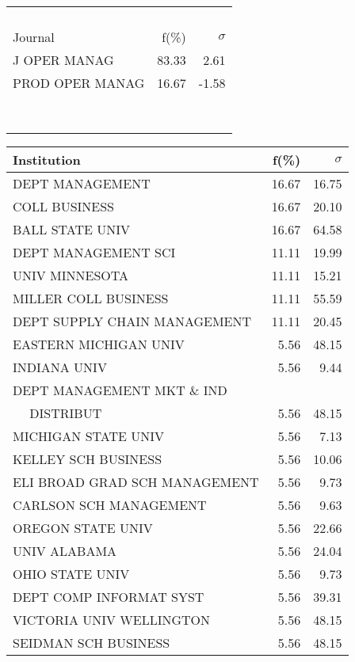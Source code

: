 \documentclass[a4paper,11pt]{report}
\begin{document}
\begin{landscape}
\begin{table}[!ht]
{\begin{tabular}{|l r  r|}
 &  & \\
 &  & \\
 &  & \\
 &  & \\
\hline
\hline
Journal & f(\%) & $\sigma$\\
\hline
J OPER MANAG & 83.33 & 2.61\\
PROD OPER MANAG & 16.67 & -1.58\\
 &  & \\
 &  & \\
 &  & \\
 &  & \\
 &  & \\
 &  & \\
 &  & \\
 &  & \\
\hline
\end{tabular}
}
{\scriptsize\begin{tabular}{|l r r|}
\hline
Institution & f(\%) & $\sigma$\\
\hline
DEPT MANAGEMENT & 16.67 & 16.75\\
COLL BUSINESS & 16.67 & 20.10\\
BALL STATE UNIV & 16.67 & 64.58\\
DEPT MANAGEMENT SCI & 11.11 & 19.99\\
UNIV MINNESOTA & 11.11 & 15.21\\
MILLER COLL BUSINESS & 11.11 & 55.59\\
DEPT SUPPLY CHAIN MANAGEMENT & 11.11 & 20.45\\
EASTERN MICHIGAN UNIV & 5.56 & 48.15\\
INDIANA UNIV & 5.56 & 9.44\\
DEPT MANAGEMENT MKT \& IND &  & \\
$\quad$ DISTRIBUT & 5.56 & 48.15\\
MICHIGAN STATE UNIV & 5.56 & 7.13\\
KELLEY SCH BUSINESS & 5.56 & 10.06\\
ELI BROAD GRAD SCH MANAGEMENT & 5.56 & 9.73\\
CARLSON SCH MANAGEMENT & 5.56 & 9.63\\
OREGON STATE UNIV & 5.56 & 22.66\\
UNIV ALABAMA & 5.56 & 24.04\\
OHIO STATE UNIV & 5.56 & 9.73\\
DEPT COMP INFORMAT SYST & 5.56 & 39.31\\
VICTORIA UNIV WELLINGTON & 5.56 & 48.15\\
SEIDMAN SCH BUSINESS & 5.56 & 48.15\\

\end{tabular}}
\end{table}
\end{landscape}
\end{document}
